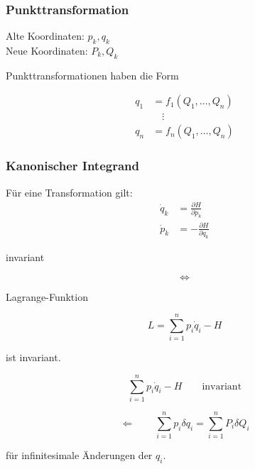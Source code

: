 \begin{frame}
    \frametitle{Punkttransformation}
    
    Alte Koordinaten: $p_k, q_k$ \\
    Neue Koordinaten: $P_k, Q_k$
    
    Punkttransformationen haben die Form
    
    \begin{align*}
    q_1 &= f_1(Q_1,\ldots,Q_n) \\
        &\quad\vdots \\
    q_n &= f_n(Q_1,\ldots,Q_n)    
    \end{align*}
    
\end{frame}

\begin{frame}
    \frametitle{Kanonischer Integrand}
    
    Für eine Transformation gilt:
        \begin{align*}
        \dot{q}_k &= \frac{\partial H}{\partial p_k} \\
        \dot{p}_k &= -\frac{\partial H}{\partial q_k}		
        \end{align*}
      \begin{center}  invariant \end{center} 
        
        \begin{displaymath}
        \Longleftrightarrow
        \end{displaymath}
        
      \begin{center} Lagrange-Funktion \end{center} 
        \begin{displaymath}
        L = \sum_{i=1}^n p_i \dot{q}_i - H
        \end{displaymath}
      \begin{center}  ist invariant. \end{center} 

\end{frame}

\begin{frame}
    \begin{displaymath}
    \sum_{i=1}^n p_i \dot{q}_i - H \qquad \text{invariant}
    \end{displaymath}
    
    \begin{displaymath}
    \Longleftarrow \qquad \sum_{i=1}^n p_i \delta q_i = \sum_{i=1}^n P_i \delta Q_i
    \end{displaymath}
    
    für infinitesimale Änderungen der $q_i$.
    
\end{frame}

